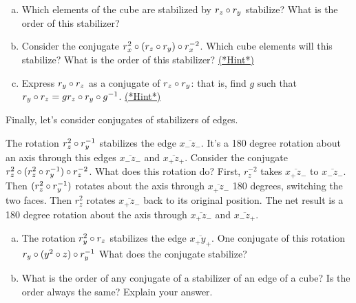 \begin{exercise}\label{exercise:actions:Conj13}
\begin{enumerate}[(a)]
\item Which elements of the cube are stabilized by $r_z\circ r_y$ stabilize?  What is the order of this stabilizer?  
\item Consider the conjugate $r_x^{2}\circ (r_z\circ r_y)\circ r_x^{-2}$.  Which cube elements will this stabilize?  What is the order of this stabilizer?
\hyperref[sec:actions:hints]{(*Hint*)}
\item Express  $r_y\circ r_z$ as a conjugate of $r_z\circ r_y$: that is, find $g$ such that 
$r_y\circ r_z = g r_z\circ r_y \circ g^{-1}$. 
\hyperref[sec:actions:hints]{(*Hint*)}
\end{enumerate}	
\end{exercise}

Finally, let's consider  conjugates of stabilizers of edges.

\begin{example}\label{example:actions:Conj14}
The rotation $r_z^2\circ r_y^{-1}$ stabilizes the edge $\overline{x_- z_-}$.  It's a 180 degree rotation about an axis through this edges  $\overline{x_- z_-}$ and $\overline{x_+z_+}$. Consider the conjugate   $r_z^{2}\circ (r_z^2\circ r_y^{-1})\circ r_z^{-2}$.  What does this rotation do?  First,  $r_z^{-2}$ takes $\overline{x_+z_-}$ to $\overline{x_-z_-}$.  Then $(r_z^2\circ r_y^{-1})$ rotates about the axis through $\overline{x_+z_-}$ 180 degrees, switching the two faces. Then $r_z^2$ rotates $\overline{x_+z_-}$ back to its original position.  The net result is a 180 degree rotation about the axis through $\overline{x_+z_-}$ and $\overline{x_-z_+}$.
\end{example}

\begin{exercise}\label{exercise:actions:Conj15}
\begin{enumerate}[(a)]
\item The rotation $r_y^2\circ r_z$ stabilizes the edge $\overline{x_+y_+}$. One conjugate of this rotation $r_y\circ (y^2\circ z)\circ r_y^{-1}$ What does the conjugate stabilize?
\item What is the order of any conjugate of a stabilizer of an edge of a cube? Is the  order always the same?  Explain your answer.
\end{enumerate}
\end{exercise}

